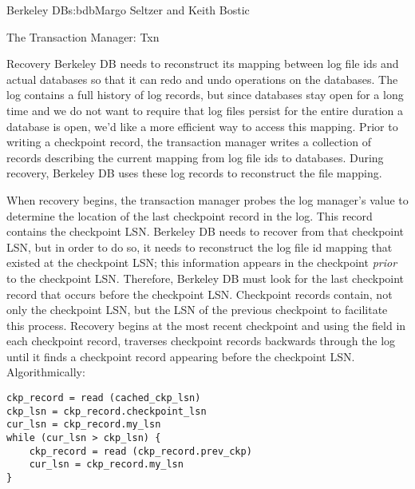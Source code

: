 \begin{aosachapter}{Berkeley DB}{s:bdb}{Margo Seltzer and Keith Bostic}
\begin{aosasect1}{The Transaction Manager: Txn}
\begin{aosasect2}{Recovery}
Berkeley DB needs to reconstruct its mapping between log file ids and
actual databases so that it can redo and undo operations on the
databases. The log contains a full history of 
log records, but since databases stay open for a long time and we do
not want to require that log files persist for the entire duration a
database is open, we'd like a more efficient way to access this
mapping. Prior to writing a checkpoint record, the transaction manager
writes a collection of  records describing the
current mapping from log file ids to databases.  During recovery,
Berkeley DB uses these log records to reconstruct the file mapping.

When recovery begins, the transaction manager probes the log manager's
 value to determine the location of the last
checkpoint record in the log. This record contains the checkpoint LSN.
Berkeley DB needs to recover from that checkpoint LSN, but in order to
do so, it needs to reconstruct the log file id mapping that existed at
the checkpoint LSN; this information appears in the checkpoint
\emph{prior} to the checkpoint LSN\@. Therefore, Berkeley DB must look
for the last checkpoint record that occurs before the checkpoint LSN.
Checkpoint records contain, not only the checkpoint LSN, but the LSN
of the previous checkpoint to facilitate this process. Recovery begins
at the most recent checkpoint and using the  field in
each checkpoint record, traverses checkpoint records backwards through
the log until it finds a checkpoint record appearing
before the checkpoint LSN\@. Algorithmically:

\vspace{-0.2cm}
\begin{verbatim}
ckp_record = read (cached_ckp_lsn)
ckp_lsn = ckp_record.checkpoint_lsn
cur_lsn = ckp_record.my_lsn
while (cur_lsn > ckp_lsn) {
    ckp_record = read (ckp_record.prev_ckp)
    cur_lsn = ckp_record.my_lsn
}
\end{verbatim}
\vspace{-0.2cm}


\end{aosasect2}
\end{aosasect1}
\end{aosachapter}
